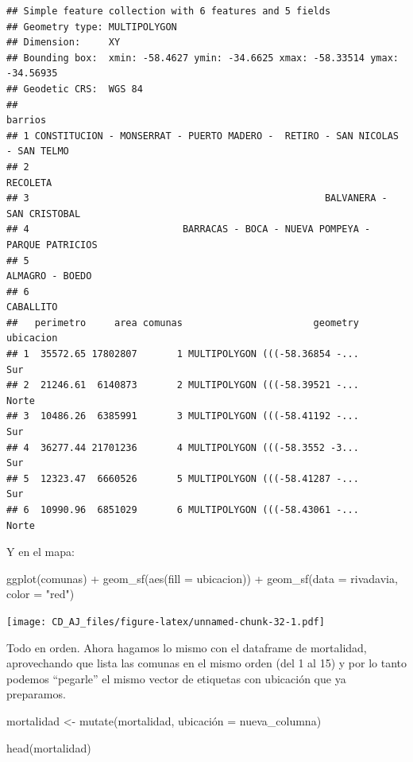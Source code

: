 \documentclass[
]{book}
\newenvironment{Shaded}{\begin{snugshade}}{\end{snugshade}}
\newcommand{\AttributeTok}[1]{\textcolor[rgb]{0.77,0.63,0.00}{#1}}
\newcommand{\FunctionTok}[1]{\textcolor[rgb]{0.00,0.00,0.00}{#1}}
\newcommand{\NormalTok}[1]{#1}
\newcommand{\OtherTok}[1]{\textcolor[rgb]{0.56,0.35,0.01}{#1}}
\newcommand{\SpecialCharTok}[1]{\textcolor[rgb]{0.00,0.00,0.00}{#1}}
\newcommand{\StringTok}[1]{\textcolor[rgb]{0.31,0.60,0.02}{#1}}
\begin{document}
\begin{verbatim}
## Simple feature collection with 6 features and 5 fields
## Geometry type: MULTIPOLYGON
## Dimension:     XY
## Bounding box:  xmin: -58.4627 ymin: -34.6625 xmax: -58.33514 ymax: -34.56935
## Geodetic CRS:  WGS 84
##                                                                        barrios
## 1 CONSTITUCION - MONSERRAT - PUERTO MADERO -  RETIRO - SAN NICOLAS - SAN TELMO
## 2                                                                     RECOLETA
## 3                                                    BALVANERA - SAN CRISTOBAL
## 4                           BARRACAS - BOCA - NUEVA POMPEYA - PARQUE PATRICIOS
## 5                                                              ALMAGRO - BOEDO
## 6                                                                    CABALLITO
##   perimetro     area comunas                       geometry ubicacion
## 1  35572.65 17802807       1 MULTIPOLYGON (((-58.36854 -...       Sur
## 2  21246.61  6140873       2 MULTIPOLYGON (((-58.39521 -...     Norte
## 3  10486.26  6385991       3 MULTIPOLYGON (((-58.41192 -...       Sur
## 4  36277.44 21701236       4 MULTIPOLYGON (((-58.3552 -3...       Sur
## 5  12323.47  6660526       5 MULTIPOLYGON (((-58.41287 -...       Sur
## 6  10990.96  6851029       6 MULTIPOLYGON (((-58.43061 -...     Norte
\end{verbatim}

Y en el mapa:

\begin{Shaded}
\begin{Highlighting}[]
\FunctionTok{ggplot}\NormalTok{(comunas) }\SpecialCharTok{+}
    \FunctionTok{geom\_sf}\NormalTok{(}\FunctionTok{aes}\NormalTok{(}\AttributeTok{fill =}\NormalTok{ ubicacion)) }\SpecialCharTok{+}
    \FunctionTok{geom\_sf}\NormalTok{(}\AttributeTok{data =}\NormalTok{ rivadavia, }\AttributeTok{color =} \StringTok{"red"}\NormalTok{)}
\end{Highlighting}
\end{Shaded}

\texttt{[image: CD\_AJ\_files/figure-latex/unnamed-chunk-32-1.pdf]}

Todo en orden. Ahora hagamos lo mismo con el dataframe de mortalidad, aprovechando que lista las comunas en el mismo orden (del 1 al 15) y por lo tanto podemos ``pegarle'' el mismo vector de etiquetas con ubicación que ya preparamos.

\begin{Shaded}
\begin{Highlighting}[]
\NormalTok{mortalidad }\OtherTok{\textless{}{-}} \FunctionTok{mutate}\NormalTok{(mortalidad, ubicación }\OtherTok{=}\NormalTok{ nueva\_columna)}
                         
\FunctionTok{head}\NormalTok{(mortalidad)}
\end{Highlighting}
\end{Shaded}
\end{document}
